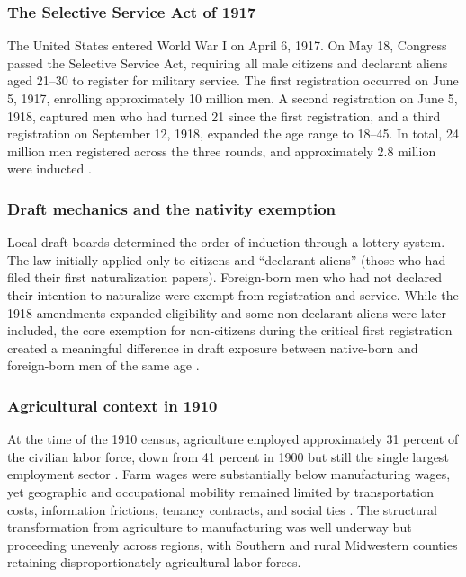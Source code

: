 \documentclass[12pt]{article}
\begin{document}
\subsubsection*{The Selective Service Act of 1917} The United States entered World War I on April 6, 1917. On May 18, Congress passed the Selective Service Act, requiring all male citizens and declarant aliens aged 21--30 to register for military service. The first registration occurred on June 5, 1917, enrolling approximately 10 million men. A second registration on June 5, 1918, captured men who had turned 21 since the first registration, and a third registration on September 12, 1918, expanded the age range to 18--45. In total, 24 million men registered across the three rounds, and approximately 2.8 million were inducted \citep{kennedy2004}.

\subsubsection*{Draft mechanics and the nativity exemption} Local draft boards determined the order of induction through a lottery system. The law initially applied only to citizens and ``declarant aliens'' (those who had filed their first naturalization papers). Foreign-born men who had not declared their intention to naturalize were exempt from registration and service. While the 1918 amendments expanded eligibility and some non-declarant aliens were later included, the core exemption for non-citizens during the critical first registration created a meaningful difference in draft exposure between native-born and foreign-born men of the same age \citep{swiencicki2020}.

\subsubsection*{Agricultural context in 1910} At the time of the 1910 census, agriculture employed approximately 31 percent of the civilian labor force, down from 41 percent in 1900 but still the single largest employment sector \citep{haines2001}. Farm wages were substantially below manufacturing wages, yet geographic and occupational mobility remained limited by transportation costs, information frictions, tenancy contracts, and social ties \citep{munshi2003}. The structural transformation from agriculture to manufacturing was well underway but proceeding unevenly across regions, with Southern and rural Midwestern counties retaining disproportionately agricultural labor forces.
\end{document}
